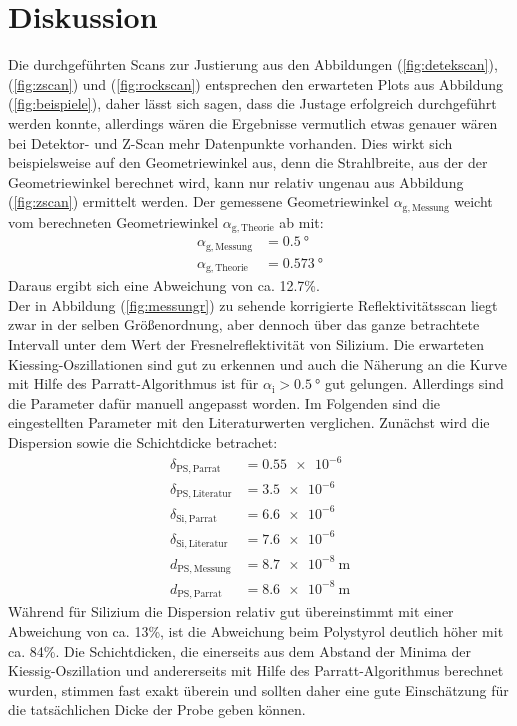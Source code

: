 \section{Diskussion}
\label{sec:Diskussion}
Die durchgeführten Scans zur Justierung aus den Abbildungen (\ref{fig:detekscan}), (\ref{fig:zscan}) und (\ref{fig:rockscan}) entsprechen den erwarteten
Plots aus Abbildung (\ref{fig:beispiele}), daher lässt sich sagen, dass die Justage
erfolgreich durchgeführt werden konnte, allerdings wären die Ergebnisse vermutlich etwas genauer wären bei Detektor- und Z-Scan mehr Datenpunkte vorhanden. Dies wirkt sich beispielsweise auf den Geometriewinkel aus, denn die Strahlbreite, aus der der Geometriewinkel berechnet wird, kann nur relativ ungenau
aus Abbildung (\ref{fig:zscan}) ermittelt werden. Der gemessene Geometriewinkel $\alpha_\mathrm{g,Messung}$ weicht vom berechneten Geometriewinkel $\alpha_\mathrm{g,Theorie}$ ab mit:
\begin{align*}
  \alpha_\mathrm{g,Messung}&= \SI{0.5}{\degree} \\
  \alpha_\mathrm{g,Theorie}&= \SI{0.573}{\degree}
\end{align*}
Daraus ergibt sich eine Abweichung von ca. 12.7\%. \\

\noindent Der in Abbildung (\ref{fig:messungr}) zu sehende korrigierte Reflektivitätsscan liegt zwar in der selben Größenordnung, aber dennoch
über das ganze betrachtete Intervall unter dem Wert der Fresnelreflektivität von Silizium. Die erwarteten Kiessing-Oszillationen sind gut zu erkennen und auch die Näherung an
die Kurve mit Hilfe des Parratt-Algorithmus ist für $\alpha_\mathrm{i}>\SI{0.5}{\degree}$ gut gelungen. Allerdings sind die Parameter dafür manuell angepasst worden. Im Folgenden
sind die eingestellten Parameter mit den Literaturwerten \cite[5]{Anleitung3} verglichen. Zunächst wird die Dispersion sowie die Schichtdicke betrachet:
\begin{align*}
  \delta_\mathrm{PS,Parrat}&= \SI{0.55 e-6}{} \\
  \delta_\mathrm{PS,Literatur}&= \SI{3.5 e-6}{} \\
  \delta_\mathrm{Si,Parrat}&= \SI{6.6 e-6}{} \\
  \delta_\mathrm{Si,Literatur}&= \SI{7.6 e-6}{} \\
  d_\mathrm{PS,Messung}&=\SI{8.7 e-8}{\meter} \\
  d_\mathrm{PS,Parrat}&=\SI{8.6 e-8}{\meter}
\end{align*}
Während für Silizium die Dispersion relativ gut übereinstimmt mit einer Abweichung von ca. 13\%, ist die Abweichung beim Polystyrol deutlich höher mit ca. 84\%.
Die Schichtdicken, die einerseits aus dem Abstand der Minima der Kiessig-Oszillation und andererseits mit Hilfe des Parratt-Algorithmus berechnet wurden, stimmen fast exakt überein und sollten
daher eine gute Einschätzung für die tatsächlichen Dicke der Probe geben können. \\

